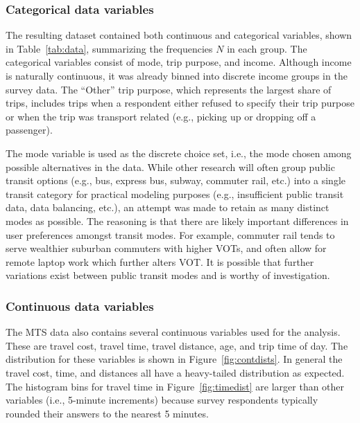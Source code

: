 \documentclass[numbered]{trbunofficial}\usepackage[]{graphicx}\usepackage[]{color}
\begin{document}
\begin{table}[H]
\end{table}

\subsubsection{Categorical data variables}
The resulting dataset contained both continuous and categorical variables, shown in Table~\ref{tab:data}, summarizing the frequencies $N$ in each group. The categorical variables consist of mode, trip purpose, and income. Although income is naturally continuous, it was already binned into discrete income groups in the survey data. The ``Other'' trip purpose, which represents the largest share of trips, includes trips when a respondent either refused to specify their trip purpose or when the trip was transport related (e.g., picking up or dropping off a passenger). 


The mode variable is used as the discrete choice set, i.e., the mode chosen among possible alternatives in the data. While other research will often group public transit options (e.g., bus, express bus, subway, commuter rail, etc.) into a single transit category for practical modeling purposes (e.g., insufficient public transit data, data balancing, etc.), an attempt was made to retain as many distinct modes as possible. The reasoning is that there are likely important differences in user preferences amongst transit modes. For example, commuter rail tends to serve wealthier suburban commuters with higher VOTs, and often allow for remote laptop work which further alters VOT. It is possible that further variations exist between public transit modes and is worthy of investigation. 

\subsubsection{Continuous data variables}
The MTS data also contains several continuous variables used for the analysis. These are travel cost, travel time, travel distance, age, and trip time of day. The distribution for these variables is shown in Figure~\ref{fig:contdists}. In general the travel cost, time, and distances all have a heavy-tailed distribution as expected. The histogram bins for travel time in Figure~\ref{fig:timedist} are larger than other variables (i.e., 5-minute increments) because survey respondents typically rounded their answers to the nearest 5 minutes.
\end{document}

